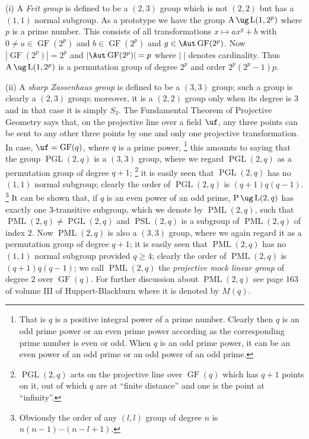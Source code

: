 (i) A {\it Feit group} is defined to be a $(2,3)$ group 
which is 
not $(2,2)$ but has a $(1,1)$ normal subgroup.  As a 
prototype 
we have the group $\operatorname{A}\ug\operatorname{L}
(1,2^p)$ where $p$ is a prime number. 
This consists of all transformations $x \mapsto ax^g+b$ 
with $0 \neq
a \in \operatorname{GF}(2^p)$ and $b \in 
\operatorname{GF}(2^p)$ and $g \in \Aut 
\operatorname{GF}(2^p)$.  Now
$|\operatorname{GF}(2^p)|=2^p$ and $|\Aut 
\operatorname{GF}(2^p)|=p$ where $|\;|$ denotes 
cardinality.
Thus $\operatorname{A}\ug \operatorname{L}(1,2^p)$ is a 
permutation group of degree $2^p$
and order $2^p(2^p-1)p$.  

(ii) A {\it sharp Zassenhaus group} is defined to be a 
$(3,3)$ group; such a 
group is clearly a $(2,3)$ group; moreover, it is a 
$(2,2)$ group only when 
its degree is 3 and in that case it is simply $S_3$.
The Fundamental Theorem of Projective Geometry says that, 
on the projective
line over a field $\uf$, any three points can be sent to 
any other
three points by one and only one projective 
transformation.  In case,
$\uf = \operatorname{GF}(q)$, where $q$ is a prime power, 
\footnote{That is $q$ is a positive integral power of a 
prime number.
Clearly then $q$ is an odd prime power or an even prime 
power according as the
corresponding prime number is even or odd. When $q$ is an 
odd prime power,
it can be an even power of an odd prime or an odd power of 
an odd prime.} 
this amounts to saying that the group 
$\operatorname{PGL}(2,q)$ is a $(3,3)$ group, where we 
regard  $\operatorname{PGL}(2,q)$ as a permutation group 
of degree $q+1$; 
\footnote{$\operatorname{PGL}(2,q)$ acts on the projective 
line over $\operatorname{GF}(q)$ which
has $q+1$ points on it, out of which $q$ are at ``finite 
distance''
and one is the point at ``infinity''.} 
it is easily seen that $\operatorname{PGL}(2,q)$ has no 
$(1,1)$ 
normal subgroup; clearly the order of 
$\operatorname{PGL}(2,q)$ is $(q+1)q(q-1)$.
\footnote{Obviously the order of any $(l,l)$ group of 
degree $n$ is 
$n(n-1)\dotsb(n-l+1)$.}
It can be shown that, if $q$ is an even power of an odd 
prime, $\operatorname{P}\ug 
\operatorname{L}(2,q)$ 
has exactly one $3$-transitive subgroup, which we denote by 
$\operatorname{PML}(2,q)$, such 
that $\operatorname{PML}(2,q)\ne \operatorname{PGL}(2,q)$ 
and 
$\operatorname{PSL}(2,q)$ is a subgroup of 
$\operatorname{PML}
(2,q)$ of index $2$. Now $\operatorname{PML}(2,q)$ is 
also a $(3,3)$ group, where we again regard it as a 
permutation group of 
degree $q+1$; 
it is easily seen that $\operatorname{PML}(2,q)$ has no 
$(1,1)$ normal subgroup
provided $q\geq4$; clearly the order of 
$\operatorname{PML}(2,q)$ is $(q+1)q(q-1)$; we call 
$\operatorname{PML}(2,q)$ the 
{\it projective mock linear group} of degree $2$ over 
$\operatorname{GF}(q)$. 
For further discussion about $\operatorname{PML}(2,q)$ see 
page 163 of volume III of
Huppert-Blackburn \cite{HB} where it is denoted by $M(q)$.
 
